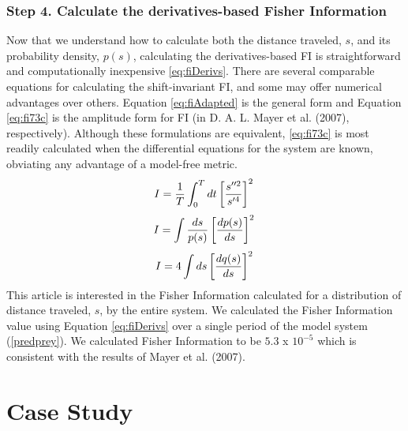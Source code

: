 \documentclass[12pt,twoside,openany]{reedthesis}
\begin{document}
\subsubsection{\texorpdfstring{\textbf{Step 4.} Calculate the
derivatives-based Fisher
Information}{Step 4. Calculate the derivatives-based Fisher Information}}\label{step-4.-calculate-the-derivatives-based-fisher-information}

Now that we understand how to calculate both the distance traveled,
\(s\), and its probability density, \(p(s)\), calculating the
derivatives-based FI is straightforward and computationally inexpensive
\eqref{eq:fiDerivs}. There are several comparable equations for
calculating the shift-invariant FI, and some may offer numerical
advantages over others. Equation \eqref{eq:fiAdapted} is the general form
and Equation \eqref{eq:fi73c} is the amplitude form for FI (in D. A. L.
Mayer et al. (2007), respectively). Although these formulations are
equivalent, \eqref{eq:fi73c} is most readily calculated when the
differential equations for the system are known, obviating any advantage
of a model-free metric.
\begin{equation}   
    I = \frac{1}{T} \int_0^T dt\left[\frac{s''^2}{s'^4}\right]^2 \\  
  \label{eq:fiDerivs}  
\end{equation}
\begin{equation} 
    I = \int \frac{ds}{p(s)}\left[\frac{dp(s)}{ds}\right]^2  \\
    \label{eq:fiAdapted}
\end{equation}
\begin{equation} 
    I = 4 \int ds\left[\frac{dq(s)}{ds}\right]^2 \\
\label{eq:fi73c}
\end{equation}
This article is interested in the Fisher Information calculated for a
distribution of distance traveled, \(s\), by the entire system. We
calculated the Fisher Information value using Equation \eqref{eq:fiDerivs}
over a single period of the model system (\ref{predprey}). We calculated
Fisher Information to be \(5.3\) x \(10^{-5}\) which is consistent with
the results of Mayer et al. (2007).

\section{Case Study}\label{case-study}
\end{document}
